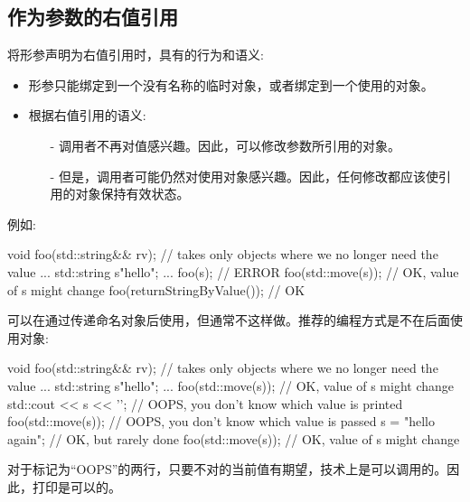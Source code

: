 \subsection{作为参数的右值引用}

将形参声明为右值引用时，具有的行为和语义:

\begin{itemize}
	\item 形参只能绑定到一个没有名称的临时对象，或者绑定到一个使用的对象。
	\item 根据右值引用的语义:
	\begin{itemize}
		\item[-] 调用者不再对值感兴趣。因此，可以修改参数所引用的对象。
		\item[-] 但是，调用者可能仍然对使用对象感兴趣。因此，任何修改都应该使引用的对象保持有效状态。
	\end{itemize}
\end{itemize}

例如:

\begin{cppcode}
void foo(std::string&& rv); // takes only objects where we no longer need the value
...
std::string s{"hello"};
...
foo(s); // ERROR
foo(std::move(s)); // OK, value of s might change
foo(returnStringByValue()); // OK
\end{cppcode}

可以在通过传递命名对象后使用，但通常不这样做。推荐的编程方式是不在后面使用对象:

\begin{cppcode}
void foo(std::string&& rv); // takes only objects where we no longer need the value
...
std::string s{"hello"};
...
foo(std::move(s)); // OK, value of s might change
std::cout << s << '\n'; // OOPS, you don’t know which value is printed
foo(std::move(s)); // OOPS, you don’t know which value is passed
s = "hello again"; // OK, but rarely done
foo(std::move(s)); // OK, value of s might change
\end{cppcode}

对于标记为“OOPS”的两行，只要不对的当前值有期望，技术上是可以调用的。因此，打印是可以的。




